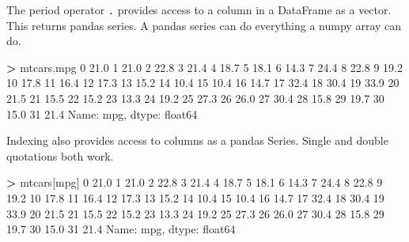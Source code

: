 \documentclass[
]{book}
\newenvironment{Shaded}{\begin{snugshade}}{\end{snugshade}}
\newcommand{\DecValTok}[1]{\textcolor[rgb]{0.00,0.00,0.81}{#1}}
\newcommand{\FloatTok}[1]{\textcolor[rgb]{0.00,0.00,0.81}{#1}}
\newcommand{\NormalTok}[1]{#1}
\newcommand{\OperatorTok}[1]{\textcolor[rgb]{0.81,0.36,0.00}{\textbf{#1}}}
\newcommand{\StringTok}[1]{\textcolor[rgb]{0.31,0.60,0.02}{#1}}
\begin{document}
The period operator \texttt{.} provides access to a column in a DataFrame as a vector. This returns pandas series. A pandas series can do everything a numpy array can do.

\begin{Shaded}
\begin{Highlighting}[]
\OperatorTok{\textgreater{}}\NormalTok{ mtcars.mpg}
\DecValTok{0}     \FloatTok{21.0}
\DecValTok{1}     \FloatTok{21.0}
\DecValTok{2}     \FloatTok{22.8}
\DecValTok{3}     \FloatTok{21.4}
\DecValTok{4}     \FloatTok{18.7}
\DecValTok{5}     \FloatTok{18.1}
\DecValTok{6}     \FloatTok{14.3}
\DecValTok{7}     \FloatTok{24.4}
\DecValTok{8}     \FloatTok{22.8}
\DecValTok{9}     \FloatTok{19.2}
\DecValTok{10}    \FloatTok{17.8}
\DecValTok{11}    \FloatTok{16.4}
\DecValTok{12}    \FloatTok{17.3}
\DecValTok{13}    \FloatTok{15.2}
\DecValTok{14}    \FloatTok{10.4}
\DecValTok{15}    \FloatTok{10.4}
\DecValTok{16}    \FloatTok{14.7}
\DecValTok{17}    \FloatTok{32.4}
\DecValTok{18}    \FloatTok{30.4}
\DecValTok{19}    \FloatTok{33.9}
\DecValTok{20}    \FloatTok{21.5}
\DecValTok{21}    \FloatTok{15.5}
\DecValTok{22}    \FloatTok{15.2}
\DecValTok{23}    \FloatTok{13.3}
\DecValTok{24}    \FloatTok{19.2}
\DecValTok{25}    \FloatTok{27.3}
\DecValTok{26}    \FloatTok{26.0}
\DecValTok{27}    \FloatTok{30.4}
\DecValTok{28}    \FloatTok{15.8}
\DecValTok{29}    \FloatTok{19.7}
\DecValTok{30}    \FloatTok{15.0}
\DecValTok{31}    \FloatTok{21.4}
\NormalTok{Name: mpg, dtype: float64}
\end{Highlighting}
\end{Shaded}

Indexing also provides access to columns as a pandas Series. Single and double quotations both work.

\begin{Shaded}
\begin{Highlighting}[]
\OperatorTok{\textgreater{}}\NormalTok{ mtcars[}\StringTok{\textquotesingle{}mpg\textquotesingle{}}\NormalTok{]}
\DecValTok{0}     \FloatTok{21.0}
\DecValTok{1}     \FloatTok{21.0}
\DecValTok{2}     \FloatTok{22.8}
\DecValTok{3}     \FloatTok{21.4}
\DecValTok{4}     \FloatTok{18.7}
\DecValTok{5}     \FloatTok{18.1}
\DecValTok{6}     \FloatTok{14.3}
\DecValTok{7}     \FloatTok{24.4}
\DecValTok{8}     \FloatTok{22.8}
\DecValTok{9}     \FloatTok{19.2}
\DecValTok{10}    \FloatTok{17.8}
\DecValTok{11}    \FloatTok{16.4}
\DecValTok{12}    \FloatTok{17.3}
\DecValTok{13}    \FloatTok{15.2}
\DecValTok{14}    \FloatTok{10.4}
\DecValTok{15}    \FloatTok{10.4}
\DecValTok{16}    \FloatTok{14.7}
\DecValTok{17}    \FloatTok{32.4}
\DecValTok{18}    \FloatTok{30.4}
\DecValTok{19}    \FloatTok{33.9}
\DecValTok{20}    \FloatTok{21.5}
\DecValTok{21}    \FloatTok{15.5}
\DecValTok{22}    \FloatTok{15.2}
\DecValTok{23}    \FloatTok{13.3}
\DecValTok{24}    \FloatTok{19.2}
\DecValTok{25}    \FloatTok{27.3}
\DecValTok{26}    \FloatTok{26.0}
\DecValTok{27}    \FloatTok{30.4}
\DecValTok{28}    \FloatTok{15.8}
\DecValTok{29}    \FloatTok{19.7}
\DecValTok{30}    \FloatTok{15.0}
\DecValTok{31}    \FloatTok{21.4}
\NormalTok{Name: mpg, dtype: float64}
\end{Highlighting}
\end{Shaded}
\end{document}
